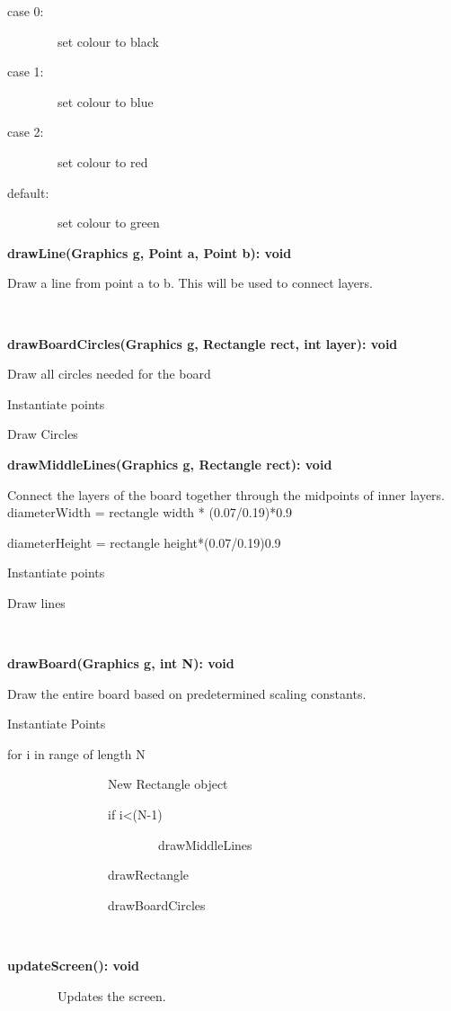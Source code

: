 \documentclass{article}
\begin{document}
{{case 0:}

{~~~~~~~~set colour to black}

{case 1:}

{~~~~~~~~set colour to blue}

{case 2: }

{~~~~~~~~set colour to red}

{default:}

{~~~~~~~~set colour to green}

{}

{}

{\textbf{drawLine(Graphics g, Point a, Point b): void}}

{Draw a line from point a to b. This will be used to connect layers. }

{~~~~~~~~~~~~~~~~}

{\textbf{drawBoardCircles(Graphics g, Rectangle rect, int layer): void}}

{Draw all circles needed for the board}

{Instantiate points}

{Draw Circles}

{}

{\textbf{drawMiddleLines(Graphics g, Rectangle rect): void}}

{Connect the layers of the board together through the midpoints of inner
layers. }{diameterWidth = rectangle width * (0.07/0.19)*0.9}

{diameterHeight = rectangle height*(0.07/0.19)0.9}

{Instantiate points}

{Draw lines}

{~~~~~~~~~~~~~~~~}

{\textbf{drawBoard(Graphics g, int N): void}}

{Draw the entire board based on predetermined scaling constants. }

{Instantiate Points}

{for i in range of length N}

{~~~~~~~~~~~~~~~~New Rectangle object}

{~~~~~~~~~~~~~~~~if i\textless{}(N-1)}

{~~~~~~~~~~~~~~~~~~~~~~~~drawMiddleLines}

{~~~~~~~~~~~~~~~~drawRectangle}

{~~~~~~~~~~~~~~~~drawBoardCircles}

{~~~~~~~~~~~~~~~~}

{\textbf{updateScreen(): void}}

{~~~~~~~~Updates the screen. ~~~~~~~~~~~~~~~~}

}
\end{document}
